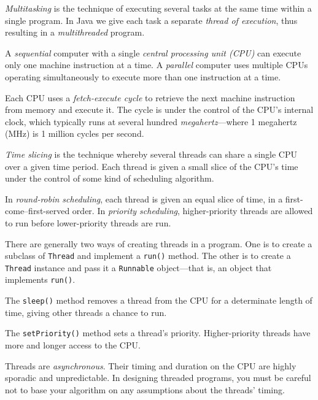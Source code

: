 \label{summaryof-important-points}
\begin{SMBL}\baselineskip=11.9pt
\item  {\it Multitasking} is the technique of executing several
tasks at the same time within a single program.  In Java
we give each task a separate {\it thread of execution},
thus resulting in a {\it multithreaded} program.

\item  A {\it sequential} computer with a single {\it central
processing unit (CPU)} can execute only one machine instruction
at a time.  A {\it parallel} computer uses multiple CPUs operating
simultaneously to execute more than one instruction at a time.

\item  Each CPU uses a {\it fetch-execute cycle} to retrieve the
next machine instruction from memory and execute it.  The cycle is
under the control of the CPU's internal clock, which typically runs at
several hundred {\it megahertz}---where 1 megahertz (MHz) is 1
million cycles per second.

\item  {\it Time slicing} is the technique whereby several threads
can share a single CPU over a given time period.  Each thread is given
a small slice of the CPU's time under the control of some kind of
scheduling algorithm.  

\item In {\it round-robin scheduling}, each thread is
given an equal slice of time, in a first-come--first-served order.  In
{\it priority scheduling}, higher-priority threads are allowed to
run before lower-priority threads are run.

\item  There are generally two ways of creating threads in a program.
One is to create a subclass of {\tt Thread} and implement a
{\tt run()} method.  The other is to create a {\tt Thread} instance
and pass it a {\tt Runnable} object---that is, an object that
implements {\tt run()}.

\item  The {\tt sleep()} method removes a thread from the CPU
for a determinate length of time, giving other threads a chance
to run.

\item  The {\tt setPriority()} method sets a thread's priority.
Higher-priority threads have more and longer access to the CPU.

\item  Threads are {\it asynchronous}. Their timing and duration
on the CPU are highly sporadic and unpredictable.  In designing
threaded programs, you must be careful not to base your
algorithm on any assumptions about the threads' timing.


\end{SMBL}
